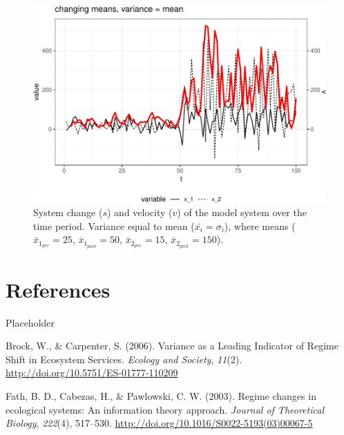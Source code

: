 \documentclass[12pt,twoside,openany]{reedthesis}
\begin{document}
\begin{figure}

{\centering \includegraphics[width=0.95\linewidth]{_myDissertation_files/figure-latex/velocSysEx4-1} 

}

\caption{System change ($s$) and velocity ($v$) of the model system over the time period. Variance equal to mean ($\bar{x_i}=\sigma_i$), where means ($\bar{x}_{1_{pre}}=25$, $\bar{x}_{1_{post}}=50$, $\bar{x}_{2_{pre}}=15$, $\bar{x}_{2_{post}}=150$).}\label{fig:velocSysEx4}
\end{figure}
\chapter*{References}\label{references}

Placeholder

\hypertarget{refs}{}
\hypertarget{ref-brock_variance_2006}{}
Brock, W., \& Carpenter, S. (2006). Variance as a Leading Indicator of
Regime Shift in Ecosystem Services. \emph{Ecology and Society},
\emph{11}(2). \url{http://doi.org/10.5751/ES-01777-110209}

\hypertarget{ref-fath_regime_2003}{}
Fath, B. D., Cabezas, H., \& Pawlowski, C. W. (2003). Regime changes in
ecological systems: An information theory approach. \emph{Journal of
Theoretical Biology}, \emph{222}(4), 517--530.
\url{http://doi.org/10.1016/S0022-5193(03)00067-5}
\end{document}
